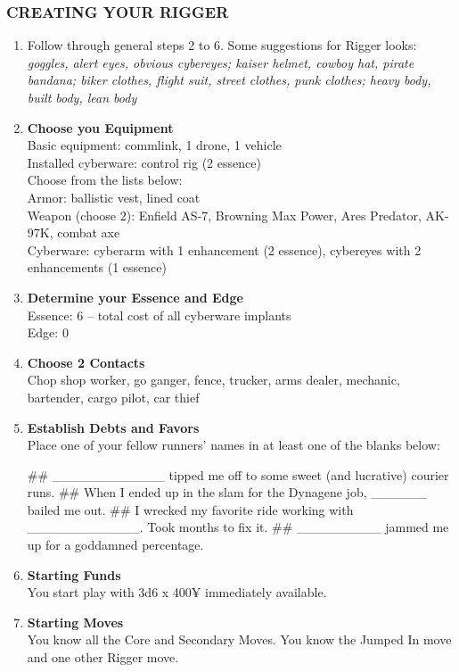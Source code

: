\subsubsection{CREATING YOUR RIGGER}
\begin{enumerate}
    \item Follow through general steps 2 to 6. Some suggestions for Rigger looks: \textit{goggles, alert eyes, obvious cybereyes; kaiser helmet, cowboy hat, pirate bandana; biker clothes, flight suit, street clothes, punk clothes; heavy body, built body, lean body}
    
    \item \textbf{Choose you Equipment} \\
    Basic equipment: commlink, 1 drone, 1 vehicle \\
    Installed cyberware: control rig (2 essence) \\
    Choose from the lists below: \\
        Armor: ballistic vest, lined coat \\
        Weapon (choose 2): Enfield AS-7, Browning Max Power, Ares Predator, AK-97K, combat axe \\
        Cyberware: cyberarm with 1 enhancement (2 essence), cybereyes with 2 enhancements (1 essence)
    
    \item \textbf{Determine your Essence and Edge} \\
    Essence: 6 – total cost of all cyberware implants \\
    Edge: 0
    
    \item \textbf{Choose 2 Contacts} \\
    Chop shop worker, go ganger, fence, trucker, arms dealer, mechanic, bartender, cargo pilot, car thief
    
    \item \textbf{Establish Debts and Favors} \\
    Place one of your fellow runners’ names in at least one of the blanks below:
        \begin{easylist}
            ## \_\_\_\_\_\_\_\_\_\_\_\_ tipped me off to some sweet (and lucrative) courier runs.
            ## When I ended up in the slam for the Dynagene job, \_\_\_\_\_\_ bailed me out.
            ## I wrecked my favorite ride working with \_\_\_\_\_\_\_\_\_\_\_\_. Took months to fix it.
            ## \_\_\_\_\_\_\_\_\_ jammed me up for a goddamned percentage.
        \end{easylist}
    
    \item \textbf{Starting Funds} \\
    You start play with 3d6 x 400¥ immediately available.
    
    \item \textbf{Starting Moves} \\
    You know all the Core and Secondary Moves. You know the Jumped In move and one other Rigger move.
\end{enumerate}

